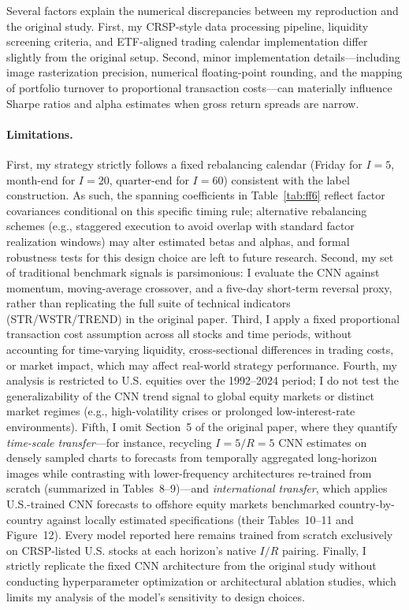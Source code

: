 \documentclass{article}
\begin{document}
Several factors explain the numerical discrepancies between my reproduction and the original study. First, my CRSP-style data processing pipeline, liquidity screening criteria, and ETF-aligned trading calendar implementation differ slightly from the original setup. Second, minor implementation details---including image rasterization precision, numerical floating-point rounding, and the mapping of portfolio turnover to proportional transaction costs---can materially influence Sharpe ratios and alpha estimates when gross return spreads are narrow.

\paragraph{Limitations.}
First, my strategy strictly follows a fixed rebalancing calendar (Friday for $I{=}5$, month-end for $I{=}20$, quarter-end for $I{=}60$) consistent with the label construction. As such, the spanning coefficients in Table~\ref{tab:ff6} reflect factor covariances conditional on this specific timing rule; alternative rebalancing schemes (e.g., staggered execution to avoid overlap with standard factor realization windows) may alter estimated betas and alphas, and formal robustness tests for this design choice are left to future research.
Second, my set of traditional benchmark signals is parsimonious: I evaluate the CNN against momentum, moving-average crossover, and a five-day short-term reversal proxy, rather than replicating the full suite of technical indicators (STR/WSTR/TREND) in the original paper.
Third, I apply a fixed proportional transaction cost assumption across all stocks and time periods, without accounting for time-varying liquidity, cross-sectional differences in trading costs, or market impact, which may affect real-world strategy performance.
Fourth, my analysis is restricted to U.S. equities over the 1992--2024 period; I do not test the generalizability of the CNN trend signal to global equity markets or distinct market regimes (e.g., high-volatility crises or prolonged low-interest-rate environments).
Fifth, I omit Section~5 of the original paper, where they quantify \emph{time-scale transfer}---for instance, recycling \(I{=}5{/}R{=}5\) CNN estimates on densely sampled charts to forecasts from temporally aggregated long-horizon images while contrasting with lower-frequency architectures re-trained from scratch (summarized in Tables~8--9)---and \emph{international transfer}, which applies U.S.-trained CNN forecasts to offshore equity markets benchmarked country-by-country against locally estimated specifications (their Tables~10--11 and Figure~12). Every model reported here remains trained from scratch exclusively on CRSP-listed U.S. stocks at each horizon's native \(I{/}R\) pairing.
Finally, I strictly replicate the fixed CNN architecture from the original study without conducting hyperparameter optimization or architectural ablation studies, which limits my analysis of the model's sensitivity to design choices.
\end{document}
